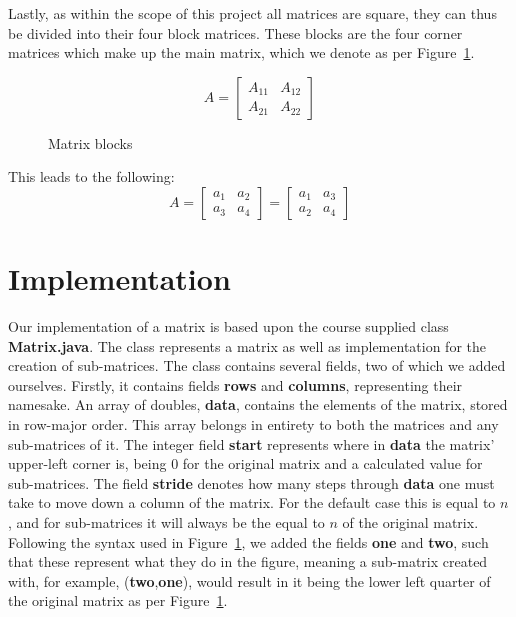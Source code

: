 \documentclass[12pt, a4paper]{article}
\begin{document}
Lastly, as within the scope of this project all matrices are square, they can thus be divided into their four block matrices. These blocks are the four corner matrices which make up the main matrix, which we denote as per Figure~\ref{fig:Matrix blocks}.
\begin{figure}
    \centering
  $$
     A
     =
     \begin{bmatrix}
     A_{11} & A_{12}\\
     A_{21} & A_{22}
     \end{bmatrix}
 $$ 
    \caption{Matrix blocks}
    \label{fig:Matrix blocks}
\end{figure}

This leads to the following: 
  $$
  A=
     \begin{bmatrix}
         a_1 & a_2\\ 
         a_3 & a_4 
     \end{bmatrix}
     =
     \begin{bmatrix}
     a_1 & a_3\\
     a_2 & a_4
     \end{bmatrix}
 $$ 

\section{Implementation}
Our implementation of a matrix is based upon the course supplied class \textbf{Matrix.java}. The class represents a matrix as well as implementation for the creation of sub-matrices. The class contains several fields, two of which we added ourselves. Firstly, it contains fields \textbf{rows} and \textbf{columns}, representing their namesake. An array of doubles, \textbf{data}, contains the elements of the matrix, stored in row-major order. This array belongs in entirety to both the matrices and any sub-matrices of it. The integer field \textbf{start} represents where in \textbf{data} the matrix' upper-left corner is, being 0 for the original matrix and a calculated value for sub-matrices. The field \textbf{stride} denotes how many steps through \textbf{data} one must take to move down a column of the matrix. For the default case this is equal to $n$, and for sub-matrices it will always be the equal to $n$ of the original matrix. Following the syntax used in Figure~\ref{fig:Matrix blocks}, we added the fields \textbf{one} and \textbf{two}, such that these represent what they do in the figure, meaning a sub-matrix created with, for example, (\textbf{two},\textbf{one}), would result in it being the lower left quarter of the original matrix as per Figure~\ref{fig:Matrix blocks}.
\end{document}
